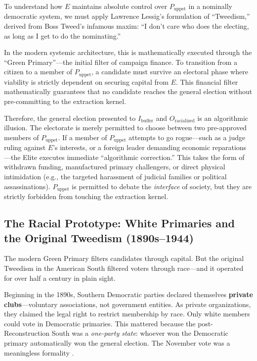 \documentclass[12pt,openany]{book}
\begin{document}
To understand how $E$ maintains absolute control over $P_{\text{uppet}}$ in a nominally democratic system, we must apply Lawrence Lessig's formulation of ``Tweedism,'' derived from Boss Tweed's infamous maxim: ``I don't care who does the electing, as long as I get to do the nominating.''

In the modern systemic architecture, this is mathematically executed through the ``Green Primary''---the initial filter of campaign finance. To transition from a citizen to a member of $P_{\text{uppet}}$, a candidate must survive an electoral phase where viability is strictly dependent on securing capital from $E$. This financial filter mathematically guarantees that no candidate reaches the general election without pre-committing to the extraction kernel.

Therefore, the general election presented to $I_{\text{buffer}}$ and $O_{\text{racialized}}$ is an algorithmic illusion. The electorate is merely permitted to choose between two pre-approved members of $P_{\text{uppet}}$. If a member of $P_{\text{uppet}}$ attempts to go rogue---such as a judge ruling against $E$'s interests, or a foreign leader demanding economic reparations---the Elite executes immediate ``algorithmic correction.'' This takes the form of withdrawn funding, manufactured primary challengers, or direct physical intimidation (e.g., the targeted harassment of judicial families or political assassinations). $P_{\text{uppet}}$ is permitted to debate the \textit{interface} of society, but they are strictly forbidden from touching the extraction kernel.

\subsection{The Racial Prototype: White Primaries and the Original Tweedism (1890s--1944)}

The modern Green Primary filters candidates through capital. But the original Tweedism in the American South filtered voters through race---and it operated for over half a century in plain sight.

Beginning in the 1890s, Southern Democratic parties declared themselves \textbf{private clubs}---voluntary associations, not government entities. As private organizations, they claimed the legal right to restrict membership by race. Only white members could vote in Democratic primaries. This mattered because the post-Reconstruction South was a \textit{one-party state}: whoever won the Democratic primary automatically won the general election. The November vote was a meaningless formality \cite{smith_v_allwright, keysack_white}.
\end{document}
